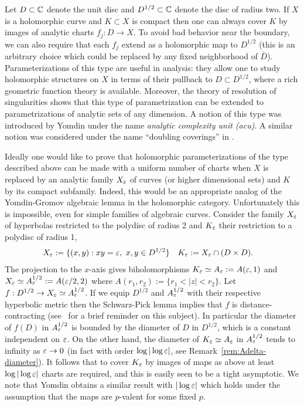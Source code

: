 \documentclass[reqno]{amsart}
\renewcommand\~[1]{\widetilde{#1}}
\begin{document}
Let $D\subset{\mathbb C}$ denote the unit disc and $D^{1/2}\subset{\mathbb C}$ denote
the disc of radius two. If $X$ is a holomorphic curve and $K\subset X$
is compact then one can always cover $K$ by images of analytic charts
$f_j:D\to X$. To avoid bad behavior near the boundary, we can also
require that each $f_j$ extend as a holomorphic map to $D^{1/2}$ (this
is an arbitrary choice which could be replaced by any fixed
neighborhood of $\bar D$). Parameterizations of this type are useful
in analysis: they allow one to study holomorphic structures on $X$ in
terms of their pullback to $D\subset D^{1/2}$, where a rich geometric
function theory is available. Moreover, the theory of resolution of
singularities shows that this type of parametrization can be extended
to parametrizations of analytic sets of any dimension. A notion of
this type was introduced by Yomdin \cite{yomdin:entropy-analytic}
under the name \emph{analytic complexity unit (acu)}. A similar notion
was considered under the name ``doubling coverings'' in
\cite{yf:doubling}.

Ideally one would like to prove that holomorphic parameterizations of
the type described above can be made with a uniform number of charts
when $X$ is replaced by an analytic family $X_\varepsilon$ of curves (or higher
dimensional sets) and $K$ by its compact subfamily. Indeed, this would
be an appropriate analog of the Yomdin-Gromov algebraic lemma in the
holomorphic category. Unfortunately this is impossible, even for
simple families of algebraic curves. Consider the family $X_\varepsilon$ of
hyperbolas restricted to the polydisc of radius 2 and $K_\varepsilon$ their
restriction to a polydisc of radius 1,
\begin{align}
  X_\varepsilon &:= \{(x,y): xy=\varepsilon,\ x,y\in D^{1/2}\} & K_\varepsilon &:= X_\varepsilon\cap (D\times D).
\end{align}
The projection to the $x$-axis gives biholomorphisms
$K_\varepsilon\simeq A_\varepsilon:=A(\varepsilon,1)$ and $X_\varepsilon\simeq A_\varepsilon^{1/2}:=A(\varepsilon/2,2)$
where $A(r_1,r_2):=\{r_1<|z|<r_2\}$. Let
$f:D^{1/2}\to X_\varepsilon\simeq A_\varepsilon^{1/2}$. If we equip $D^{1/2}$ and
$A_\varepsilon^{1/2}$ with their respective hyperbolic metric then the
Schwarz-Pick lemma implies that $f$ is distance-contracting
(see~ for a brief reminder on this
subject). In particular the diameter of $f(D)$ in $A_\varepsilon^{1/2}$ is
bounded by the diameter of $D$ in $D^{1/2}$, which is a constant
independent on $\varepsilon$. On the other hand, the diameter of
$K_\varepsilon\simeq A_\varepsilon$ in $A_\varepsilon^{1/2}$ tends to infinity as $\varepsilon\to0$ (in
fact with order $\log|\log\varepsilon|$, see
Remark~\ref{rem:Adelta-diameter}). It follows that to cover $K_\varepsilon$ by
images of maps as above at least $\log|\log\varepsilon|$ charts are required,
and this is easily seen to be a tight asymptotic. We note that Yomdin
\cite{yomdin:param-dim2} obtains a similar result with $|\log\varepsilon|$
which holds under the assumption that the maps are $p$-valent for some
fixed $p$.
\end{document}
